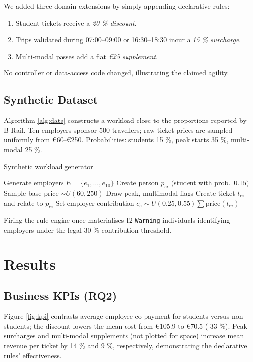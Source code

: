 \documentclass[lettersize,journal]{IEEEtran}
\begin{document}
We added three domain extensions by simply appending declarative rules:

\begin{enumerate}
\item Student tickets receive a \emph{20 \% discount}.
\item Trips validated during 07:00–09:00 or 16:30–18:30 incur a \emph{15 \% surcharge}.
\item Multi-modal passes add a flat \emph{€25 supplement}.
\end{enumerate}

No controller or data-access code changed, illustrating the claimed agility.

\subsection{Synthetic Dataset}
Algorithm \ref{alg:data} constructs a workload close to the proportions reported by B-Rail.  
Ten employers sponsor 500 travellers; raw ticket prices are sampled uniformly from €60–€250.  
Probabilities: students 15 \%, peak starts 35 \%, multi-modal 25 \%.

\begin{algorithm}[!t]
\caption{Synthetic workload generator}
\label{alg:data}
\begin{algorithmic}[1]
\STATE Generate employers $E=\{e_1,\dots,e_{10}\}$
     \STATE Create person $p_{ei}$ (student with prob.\ 0.15)
     \STATE Sample base price $\sim U(60,250)$
     \STATE Draw peak, multimodal flags
     \STATE Create ticket $t_{ei}$ and relate to $p_{ei}$
  \ENDFOR
  \STATE Set employer contribution $c_e \sim U(0.25,0.55)\sum \text{price}(t_{ei})$
\ENDFOR
\end{algorithmic}
\end{algorithm}

Firing the rule engine once materialises 12 \texttt{Warning} individuals identifying employers under the legal 30 \% contribution threshold.

\section{Results}
\subsection{Business KPIs (\textbf{RQ2})}
Figure \ref{fig:kpi} contrasts average employee co-payment for students versus non-students; the discount lowers the mean cost from €105.9 to €70.5 (-33 \%).  
Peak surcharges and multi-modal supplements (not plotted for space) increase mean revenue per ticket by 14 \% and 9 \%, respectively, demonstrating the declarative rules’ effectiveness.
\end{document}
